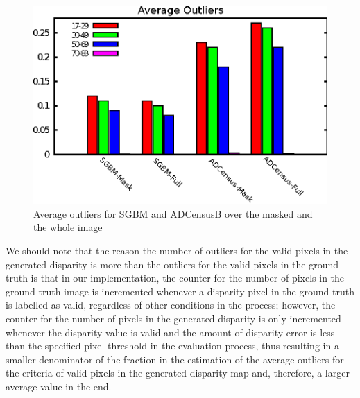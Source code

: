 \begin{figure}[H]
\centering
\includegraphics[scale=0.95]{outlchart}
\caption{Average outliers for SGBM and ADCensusB over the masked and the whole image}
\label{fig:outlbar}
\end{figure} 

We should note that the reason the number of outliers for the valid pixels in the generated disparity is more than the outliers for the valid pixels
in the ground truth is that in our implementation, the counter for the number of pixels in the ground truth image 
is incremented whenever a disparity pixel in the ground truth is labelled as valid, regardless of other conditions in the process; 
however, the counter for the number of pixels in the generated disparity
is only incremented whenever the disparity value is valid and the amount of disparity error is less than the specified pixel threshold in the evaluation process, thus resulting
in a smaller denominator of the fraction in the estimation of the average outliers for the criteria of valid pixels in the generated disparity map and, therefore, a larger 
average value in the end.

